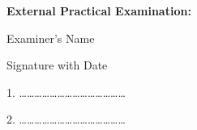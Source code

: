 \documentclass[12pt,a4paper]{report}
\begin{document}
\par
\vspace{0.25in}
\begin{center}
\large \textbf{External Practical Examination:}
\end{center}
\begin{flushleft}
\begin{normalsize}Examiner's Name \end{normalsize}
\hspace{7.5cm}
\begin{normalsize}Signature with Date\end{normalsize}
\end{flushleft}
\par
\vspace{0.05in}
\begin{flushleft}
1. \ldots\ldots\ldots\ldots\ldots\ldots \ldots \hspace{6.8cm}\ldots\ldots\ldots\ldots \ldots\ldots\ldots 
\par
\vspace{0.25in}	
2. \ldots\ldots\ldots\ldots\ldots\ldots \ldots \hspace{6.8cm}\ldots\ldots\ldots\ldots \ldots\ldots\ldots 
\end{flushleft}
\end{document}
